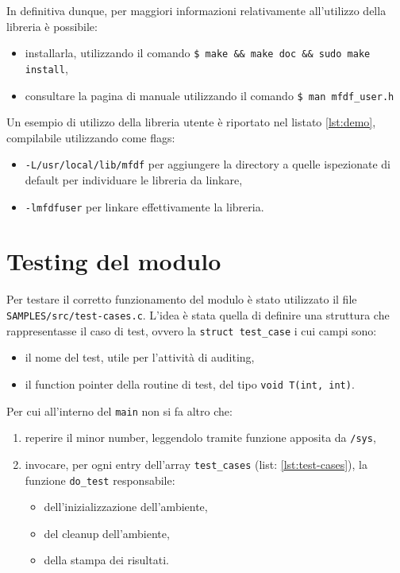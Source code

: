 \documentclass{article}
\newcommand{\terminal}[1]{\colorbox{tn-bg}{\textcolor{tn-fg}{\texttt{#1}}}}
\begin{document}
In definitiva dunque, per maggiori informazioni relativamente all'utilizzo della libreria è possibile:
\begin{itemize}
        \item installarla, utilizzando il comando \terminal{\$ make \&\& make doc \&\& sudo make install},
        \item consultare la pagina di manuale utilizzando il comando \terminal{\$ man mfdf\_user.h}
\end{itemize}

Un esempio di utilizzo della libreria utente è riportato nel listato \ref{lst:demo}, compilabile utilizzando come flags:
\begin{itemize}
        \item \texttt{-L/usr/local/lib/mfdf} per aggiungere la directory a quelle ispezionate di default per individuare le libreria da linkare,
        \item \texttt{-lmfdfuser} per linkare effettivamente la libreria.
\end{itemize}

\section{Testing del modulo}
Per testare il corretto funzionamento del modulo è stato utilizzato il file \texttt{SAMPLES/src/test-cases.c}. L'idea è stata quella di definire una struttura che rappresentasse il caso di test, ovvero la \texttt{struct test\_case} i cui campi sono:
\begin{itemize}
        \item il nome del test, utile per l'attività di auditing,
        \item il function pointer della routine di test, del tipo \texttt{void T(int, int)}.
\end{itemize}

Per cui all'interno del \texttt{main} non si fa altro che:
\begin{enumerate}
        \item reperire il minor number, leggendolo tramite funzione apposita da \texttt{/sys},
        \item invocare, per ogni entry dell'array \texttt{test\_cases} (list: \ref{lst:test-cases}), la funzione \texttt{do\_test} responsabile:
                \begin{itemize}
                        \item dell'inizializzazione dell'ambiente,
                        \item del cleanup dell'ambiente,
                        \item della stampa dei risultati.
                \end{itemize}
\end{enumerate}
\end{document}
